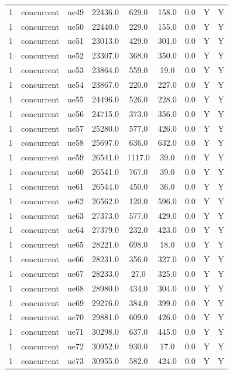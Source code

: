 \begin{table}[ht]
\begin{tabular}{|c|c|c|c|c|c|c|c|c|}
1 & concurrent & ue49 & 22436.0 & 629.0 & 158.0 & 0.0 & Y & Y \\
1 & concurrent & ue50 & 22440.0 & 229.0 & 155.0 & 0.0 & Y & Y \\
1 & concurrent & ue51 & 23013.0 & 429.0 & 301.0 & 0.0 & Y & Y \\
1 & concurrent & ue52 & 23307.0 & 368.0 & 350.0 & 0.0 & Y & Y \\
1 & concurrent & ue53 & 23864.0 & 559.0 & 19.0 & 0.0 & Y & Y \\
1 & concurrent & ue54 & 23867.0 & 220.0 & 227.0 & 0.0 & Y & Y \\
1 & concurrent & ue55 & 24496.0 & 526.0 & 228.0 & 0.0 & Y & Y \\
1 & concurrent & ue56 & 24715.0 & 373.0 & 356.0 & 0.0 & Y & Y \\
1 & concurrent & ue57 & 25280.0 & 577.0 & 426.0 & 0.0 & Y & Y \\
1 & concurrent & ue58 & 25697.0 & 636.0 & 632.0 & 0.0 & Y & Y \\
1 & concurrent & ue59 & 26541.0 & 1117.0 & 39.0 & 0.0 & Y & Y \\
1 & concurrent & ue60 & 26541.0 & 767.0 & 39.0 & 0.0 & Y & Y \\
1 & concurrent & ue61 & 26544.0 & 450.0 & 36.0 & 0.0 & Y & Y \\
1 & concurrent & ue62 & 26562.0 & 120.0 & 596.0 & 0.0 & Y & Y \\
1 & concurrent & ue63 & 27373.0 & 577.0 & 429.0 & 0.0 & Y & Y \\
1 & concurrent & ue64 & 27379.0 & 232.0 & 423.0 & 0.0 & Y & Y \\
1 & concurrent & ue65 & 28221.0 & 698.0 & 18.0 & 0.0 & Y & Y \\
1 & concurrent & ue66 & 28231.0 & 356.0 & 327.0 & 0.0 & Y & Y \\
1 & concurrent & ue67 & 28233.0 & 27.0 & 325.0 & 0.0 & Y & Y \\
1 & concurrent & ue68 & 28980.0 & 434.0 & 304.0 & 0.0 & Y & Y \\
1 & concurrent & ue69 & 29276.0 & 384.0 & 399.0 & 0.0 & Y & Y \\
1 & concurrent & ue70 & 29881.0 & 609.0 & 426.0 & 0.0 & Y & Y \\
1 & concurrent & ue71 & 30298.0 & 637.0 & 445.0 & 0.0 & Y & Y \\
1 & concurrent & ue72 & 30952.0 & 930.0 & 17.0 & 0.0 & Y & Y \\
1 & concurrent & ue73 & 30955.0 & 582.0 & 424.0 & 0.0 & Y & Y \\

\end{tabular}
\end{table}
